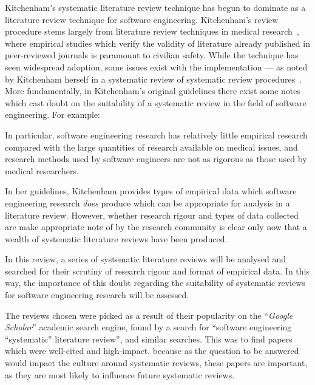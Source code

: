 Kitchenham's systematic literature review technique has begun to dominate as a literature review technique for software engineering. Kitchenham's review procedure stems largely from literature review techniques in medical research~\citep{Kitchenham2004, khan2001undertaking}, where empirical studies which verify the validity of literature already published in peer-reviewed journals is paramount to civilian safety. While the technique has seen widespread adoption, some issues exist with the implementation --- as noted by Kitchenham herself in a systematic review of systematic review procedures~\citep{Kitchenham2013}. More fundamentally, in Kitchenham's original guidelines there exist some notes which cast doubt on the suitability of a systematic review in the field of software engineering. For example:
\begin{displayquote}
    In particular, software engineering research has relatively little empirical research compared with the large quantities of research available on medical issues, and research methods used by software engineers are not as rigorous as those used by medical researchers.
\end{displayquote}
In her guidelines, Kitchenham provides types of empirical data which software engineering research \emph{does} produce which can be appropriate for analysis in a literature review. However, whether research rigour and types of data collected are make appropriate note of by the research community is clear only now that a wealth of systematic literature reviews have been produced.\par

In this review, a series of systematic literature reviews will be analysed and searched for their scrutiny of research rigour and format of empirical data. In this way, the importance of this doubt regarding the suitability of systematic reviews for software engineering research will be assessed.\par

The reviews chosen were picked as a result of their popularity on the ``\emph{Google Scholar}'' academic search engine, found by a search for ``software engineering ``systematic'' literature review'', and similar searches. This was to find papers which were well-cited and high-impact, because as the question to be answered would impact the culture around systematic reviews, these papers are important, as they are most likely to influence future systematic reviews.\par


